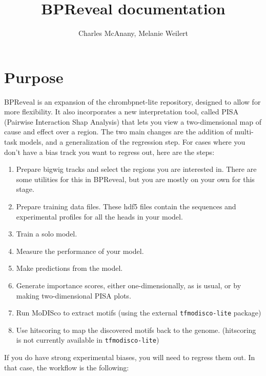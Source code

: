\documentclass{article}
\title{BPReveal documentation}
\author{Charles McAnany, Melanie Weilert}
\begin{document}
\maketitle

\tableofcontents

\newpage

\section{Purpose}

BPReveal is an expansion of the chrombpnet-lite repository, designed to allow for more flexibility.
It also incorporates a new interpretation tool, called PISA (Pairwise Interaction Shap Analysis) that lets you view a two-dimensional map of cause and effect over a region.
The two main changes are the addition of multi-task models, and a generalization of the regression step.
For cases where you don't have a bias track you want to regress out, here are the steps:

\begin{enumerate}
    \item Prepare bigwig tracks and select the regions you are interested in. There are some utilities for this in BPReveal, but you are mostly on your own for this stage.
    \item Prepare training data files. These hdf5 files contain the sequences and experimental profiles for all the heads in your model.
    \item Train a solo model.
    \item Measure the performance of your model.
    \item Make predictions from the model.
    \item Generate importance scores, either one-dimensionally, as is usual, or by making two-dimensional PISA plots.
    \item Run MoDISco to extract motifs (using the external \texttt{tfmodisco-lite} package)
    \item Use hitscoring to map the discovered motifs back to the genome. (hitscoring is not currently available in \texttt{tfmodisco-lite})
\end{enumerate}

If you do have strong experimental biases, you will need to regress them out. In that case, the workflow is the following:
\end{document}
